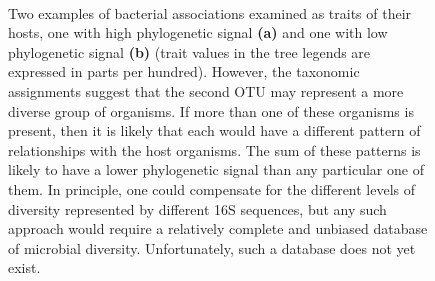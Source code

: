 
\begin{figure}
    \centering
    \\
    \caption{Two examples of bacterial associations examined as traits of their hosts, one with high phylogenetic signal \textbf{(a)} and one with low phylogenetic signal \textbf{(b)} (trait values in the tree legends are expressed in parts per hundred). However, the taxonomic assignments suggest that the second OTU may represent a more diverse group of organisms. If more than one of these organisms is present, then it is likely that each would have a different pattern of relationships with the host organisms. The sum of these patterns is likely to have a lower phylogenetic signal than any particular one of them. In principle, one could compensate for the different levels of diversity represented by different 16S sequences, but any such approach would require a relatively complete and unbiased database of microbial diversity. Unfortunately, such a database does not yet exist.}
    \label{fig:FP_fig4}
\end{figure}